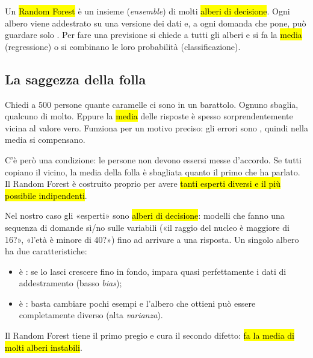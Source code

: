 
\begin{inbreve}
Un \hl{Random Forest} è un insieme (\emph{ensemble}) di molti \hl{alberi di decisione}. Ogni albero viene addestrato su una versione  dei dati e, a ogni domanda che pone, può guardare solo . Per fare una previsione si chiede a tutti gli alberi e si fa la \hl{media} (regressione) o si combinano le loro probabilità (classificazione).
\end{inbreve}

\subsection{La saggezza della folla}

\begin{intuizione}
Chiedi a 500 persone quante caramelle ci sono in un barattolo. Ognuno sbaglia, qualcuno di molto. Eppure la \hl{media} delle risposte è spesso sorprendentemente vicina al valore vero. Funziona per un motivo preciso: gli errori sono , quindi nella media si compensano.

C'è però una condizione: le persone non devono essersi messe d'accordo. Se tutti copiano il vicino, la media della folla è sbagliata quanto il primo che ha parlato. Il Random Forest è costruito proprio per avere \hl{tanti esperti diversi e il più possibile indipendenti}.
\end{intuizione}

Nel nostro caso gli «esperti» sono \hl{alberi di decisione}: modelli che fanno una sequenza di domande sì/no sulle variabili («il raggio del nucleo è maggiore di 16?», «l'età è minore di 40?») fino ad arrivare a una risposta. Un singolo albero ha due caratteristiche:
\begin{itemize}
  \item è : se lo lasci crescere fino in fondo, impara quasi perfettamente i dati di addestramento (basso \emph{bias});
  \item è : basta cambiare pochi esempi e l'albero che ottieni può essere completamente diverso (alta \emph{varianza}).
\end{itemize}
Il Random Forest tiene il primo pregio e cura il secondo difetto: \hl{fa la media di molti alberi instabili}.

